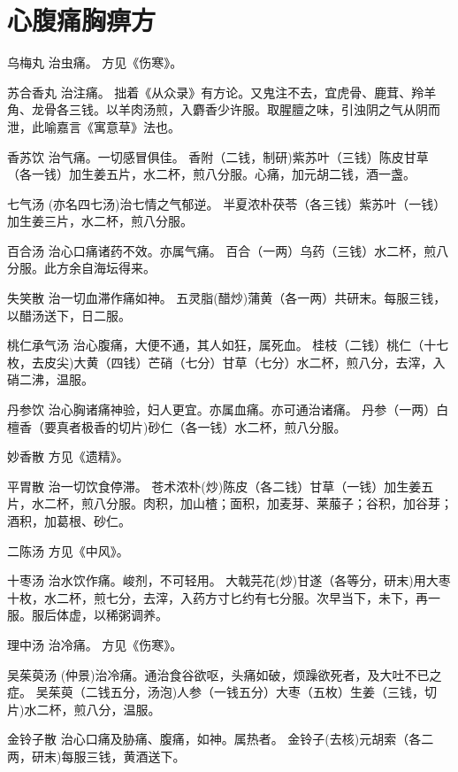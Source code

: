 \documentclass[a4paper,12pt,UTF8,twoside]{ctexbook}
\begin{document}
    \section{心腹痛胸痹方}
     乌梅丸
    治虫痛。
    方见《伤寒》。
    
    苏合香丸
    治注痛。
    拙着《从众录》有方论。又鬼注不去，宜虎骨、鹿茸、羚羊角、龙骨各三钱。以羊肉汤煎，入麝香少许服。取腥膻之味，引浊阴之气从阴而泄，此喻嘉言《寓意草》法也。
    
    香苏饮
    治气痛。一切感冒俱佳。
    香附（二钱，制研)紫苏叶（三钱）陈皮甘草（各一钱）加生姜五片，水二杯，煎八分服。心痛，加元胡二钱，酒一盏。
    
    七气汤
    (亦名四七汤)治七情之气郁逆。
    半夏浓朴茯苓（各三钱）紫苏叶（一钱）加生姜三片，水二杯，煎八分服。
    
    百合汤
    治心口痛诸药不效。亦属气痛。
    百合（一两）乌药（三钱）水二杯，煎八分服。此方余自海坛得来。
    
    失笑散
    治一切血滞作痛如神。
    五灵脂(醋炒)蒲黄（各一两）共研末。每服三钱，以醋汤送下，日二服。
    
    桃仁承气汤
    治心腹痛，大便不通，其人如狂，属死血。
    桂枝（二钱）桃仁（十七枚，去皮尖)大黄（四钱）芒硝（七分）甘草（七分）水二杯，煎八分，去滓，入硝二沸，温服。
    
    丹参饮
    治心胸诸痛神验，妇人更宜。亦属血痛。亦可通治诸痛。
    丹参（一两）白檀香（要真者极香的切片)砂仁（各一钱）水二杯，煎八分服。
    
    妙香散
    方见《遗精》。
    
    平胃散
    治一切饮食停滞。
    苍术浓朴(炒)陈皮（各二钱）甘草（一钱）加生姜五片，水二杯，煎八分服。肉积，加山楂；面积，加麦芽、莱菔子；谷积，加谷芽；酒积，加葛根、砂仁。
    
    二陈汤
    方见《中风》。
    
    十枣汤
    治水饮作痛。峻剂，不可轻用。
    大戟芫花(炒)甘遂（各等分，研末)用大枣十枚，水二杯，煎七分，去滓，入药方寸匕约有七分服。次早当下，未下，再一服。服后体虚，以稀粥调养。
    
    理中汤
    治冷痛。
    方见《伤寒》。
    
    吴茱萸汤
    (仲景)治冷痛。通治食谷欲呕，头痛如破，烦躁欲死者，及大吐不已之症。
    吴茱萸（二钱五分，汤泡)人参（一钱五分）大枣（五枚）生姜（三钱，切片)水二杯，煎八分，温服。
    
    金铃子散
    治心口痛及胁痛、腹痛，如神。属热者。
    金铃子(去核)元胡索（各二两，研末)每服三钱，黄酒送下。
    
\end{document}
